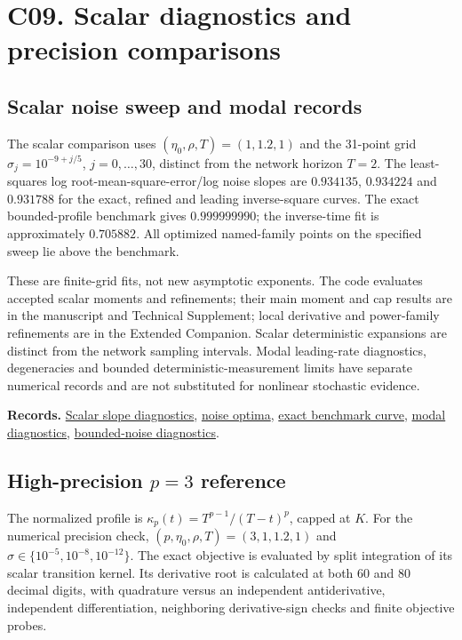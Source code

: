 \documentclass[11pt,a4paper]{article}
\begin{document}
\section{C09. Scalar diagnostics and precision comparisons}\label{c09}

\subsection{Scalar noise sweep and modal records}\label{c09-scalar}

The scalar comparison uses \((\eta_0,\rho,T)=(1,1.2,1)\) and the
31-point grid \(\sigma_j=10^{-9+j/5}\), \(j=0,\ldots,30\), distinct from
the network horizon \(T=2\). The least-squares log
root-mean-square-error/log noise slopes are \(0.934135\), \(0.934224\)
and \(0.931788\) for the exact, refined and leading inverse-square
curves. The exact bounded-profile benchmark gives \(0.999999990\); the
inverse-time fit is approximately \(0.705882\). All optimized
named-family points on the specified sweep lie above the benchmark.

These are finite-grid fits, not new asymptotic exponents. The code
evaluates accepted scalar moments and refinements; their main moment and
cap results are in the manuscript and Technical Supplement; local
derivative and power-family refinements are in the Extended Companion.
Scalar deterministic expansions are distinct from the network sampling
intervals. Modal leading-rate diagnostics, degeneracies and bounded
deterministic-measurement limits have separate numerical records and are
not substituted for nonlinear stochastic evidence.

\textbf{Records.}
\href{../data/records/modal_lambert_remainder_and_slopes.csv}{Scalar
slope diagnostics},
\href{../data/records/schedule_noise_optima.csv}{noise optima},
\href{../data/records/dirichlet_envelope_curves.csv}{exact benchmark
curve}, \href{../data/records/modal_asymptotics.csv}{modal diagnostics},
\href{../data/records/modal_bounded_noise_limits.csv}{bounded-noise
diagnostics}.

\subsection{\texorpdfstring{High-precision \(p=3\)
reference}{High-precision p=3 reference}}\label{c09-power}

The normalized profile is \(\kappa_p(t)=T^{p-1}/(T-t)^p\), capped at
\(K\). For the numerical precision check,
\((p,\eta_0,\rho,T)=(3,1,1.2,1)\) and
\(\sigma\in\{10^{-5},10^{-8},10^{-12}\}\). The exact objective is
evaluated by split integration of its scalar transition kernel. Its
derivative root is calculated at both 60 and 80 decimal digits, with
quadrature versus an independent antiderivative, independent
differentiation, neighboring derivative-sign checks and finite objective
probes.
\end{document}
